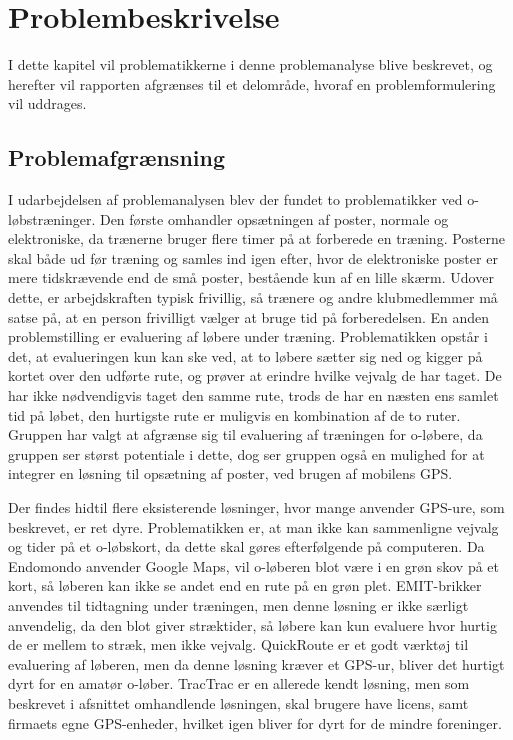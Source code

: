 \chapter{Problembeskrivelse}
I dette kapitel vil problematikkerne i denne problemanalyse blive beskrevet, og herefter vil rapporten afgrænses til et delområde, hvoraf en problemformulering vil uddrages.

\section{Problemafgrænsning}
I udarbejdelsen af problemanalysen blev der fundet to problematikker ved o-løbstræninger. Den første omhandler opsætningen af poster, normale og elektroniske, da trænerne bruger flere timer på at forberede en træning. Posterne skal både ud før træning og samles ind igen efter, hvor de elektroniske poster er mere tidskrævende end de små poster, bestående kun af en lille skærm. Udover dette, er arbejdskraften typisk frivillig, så trænere og andre klubmedlemmer må satse på, at en person frivilligt vælger at bruge tid på forberedelsen. En anden problemstilling er evaluering af løbere under træning. Problematikken opstår i det, at evalueringen kun kan ske ved, at to løbere sætter sig ned og kigger på kortet over den udførte rute, og prøver at erindre hvilke vejvalg de har taget. De har ikke nødvendigvis taget den samme rute, trods de har en næsten ens samlet tid på løbet, den hurtigste rute er muligvis en kombination af de to ruter. Gruppen har valgt at afgrænse sig til evaluering af træningen for o-løbere, da gruppen ser størst potentiale i dette, dog ser gruppen også en mulighed for at integrer en løsning til opsætning af poster, ved brugen af mobilens GPS. 

Der findes hidtil flere eksisterende løsninger, hvor mange anvender GPS-ure, som beskrevet, er ret dyre. Problematikken er, at man ikke kan sammenligne vejvalg og tider på et o-løbskort, da dette skal gøres efterfølgende på computeren. Da Endomondo anvender Google Maps, vil o-løberen blot være i en grøn skov på et kort, så løberen kan ikke se andet end en rute på en grøn plet. EMIT-brikker anvendes til tidtagning under træningen, men denne løsning er ikke særligt anvendelig, da den blot giver stræktider, så løbere kan kun evaluere hvor hurtig de er mellem to stræk, men ikke vejvalg. QuickRoute er et godt værktøj til evaluering af løberen, men da denne løsning kræver et GPS-ur, bliver det hurtigt dyrt for en amatør o-løber.
TracTrac er en allerede kendt løsning, men som beskrevet i afsnittet omhandlende løsningen, skal brugere have licens, samt firmaets egne GPS-enheder, hvilket igen bliver for dyrt for de mindre foreninger.

